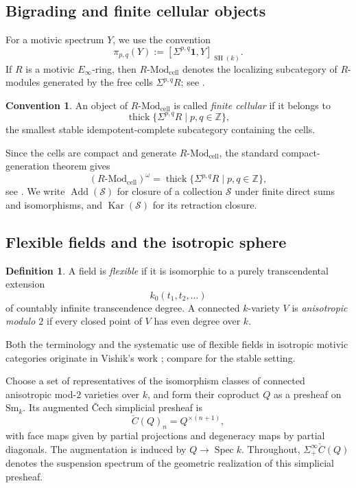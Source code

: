 \documentclass[11pt]{amsart}
\numberwithin{equation}{section}
\theoremstyle{definition}
\newtheorem{definition}[theorem]{Definition}
\newtheorem{convention}[theorem]{Convention}
\theoremstyle{remark}
\DeclareMathOperator{\Kar}{Kar}
\DeclareMathOperator{\Add}{Add}
\DeclareMathOperator{\thick}{thick}
\DeclareMathOperator{\Spec}{Spec}
\DeclareMathOperator{\SH}{SH}
\newcommand{\one}{\mathbf 1}
\newcommand{\cell}{\mathrm{cell}}
\newcommand{\Mod}{\mathrm{Mod}}
\newcommand{\Sm}{\mathrm{Sm}}
\begin{document}
\subsection{Bigrading and finite cellular objects}

For a motivic spectrum $Y$, we use the convention
\[
  \pi_{p,q}(Y):=[\Sigma^{p,q}\one,Y]_{\SH(k)}.
\]
If $R$ is a motivic $E_\infty$-ring, then
$R\text{-}\Mod_{\cell}$ denotes the localizing subcategory of $R$-modules
generated by the free cells $\Sigma^{p,q}R$; see
\cite{DuggerIsaksen,TananiaCellular}.

\begin{convention}\label{conv:finite-cell}
An object of $R\text{-}\Mod_{\cell}$ is called \emph{finite cellular} if it belongs to
\[
  \thick\{\Sigma^{p,q}R\mid p,q\in\mathbb Z\},
\]
the smallest stable idempotent-complete subcategory containing the cells.

\end{convention}

Since the cells are compact and generate $R\text{-}\Mod_{\cell}$, the
standard compact-generation theorem gives
\[
  (R\text{-}\Mod_{\cell})^\omega
  =\thick\{\Sigma^{p,q}R\mid p,q\in\mathbb Z\},
\]
see \cite[Lemma~4.4.5]{NeemanTriangulated}.  We write
$\Add(\mathcal S)$ for
closure of a collection $\mathcal S$ under finite direct sums and isomorphisms,
and $\Kar(\mathcal S)$ for its retraction closure.

\subsection{Flexible fields and the isotropic sphere}

\begin{definition}\label{def:flexible}
A field is \emph{flexible} if it is isomorphic to a purely transcendental
extension
\[
  k_0(t_1,t_2,\ldots)
\]
of countably infinite transcendence degree.  A connected $k$-variety $V$ is
\emph{anisotropic modulo $2$} if every closed point of $V$ has even degree
over $k$.
\end{definition}

Both the terminology and the systematic use of flexible fields in isotropic
motivic categories originate in Vishik's work \cite{VishikIsotropic}; compare
\cite[Definitions~3.1--3.4]{TananiaCellular} for the stable setting.

Choose a set of representatives of the isomorphism classes of connected
anisotropic mod-$2$ varieties over $k$, and form their
coproduct $Q$ as a presheaf on $\Sm_k$.  Its augmented \v{C}ech simplicial
presheaf is
\[
  \check C(Q)_n=Q^{\times(n+1)},
\]
with face maps given by partial projections and degeneracy maps by partial
diagonals.  The augmentation is induced by $Q\to\Spec k$.
Throughout, $\Sigma^\infty_+\check C(Q)$ denotes the suspension spectrum of
the geometric realization of this simplicial presheaf.
\end{document}
